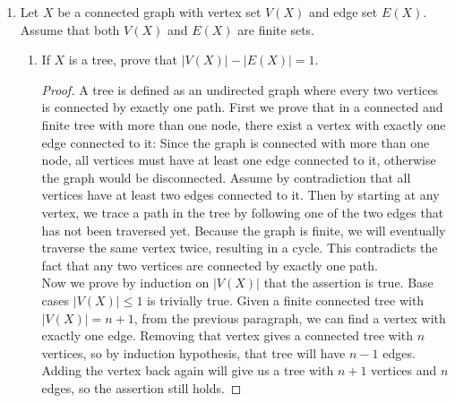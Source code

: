 \documentclass{article}
\begin{document}
\begin{enumerate}[label={\bf Q\arabic*:}]
\begin{proof}
      $\phi$ can be extended to a homomorphism since it defines a map for
      all generators. This homomorphism will be subjective because all
      generators $r$ and $s$ of the range $D_8$ has a pre-image.
      Furthermore, this homomorphism is well-defined because it preserves
      the relations on $\pi_1(\sum_g,p)$; we can verify that
      \begin{equation*}
        \phi(a_1b_1a_1^{-1}b_1^{-1}\ldots a_gb_ga_g^{-1}b_g^{-1}) =
        1_{D_8}.
      \end{equation*}
      Hence $\pi_1(\sum_g,p)$ is not abelian.
    \end{proof}

  \item Let $X$ be a connected graph with vertex set $V(X)$ and edge set
    $E(X)$. Assume that both $V(X)$ and $E(X)$ are finite sets.
    \begin{enumerate}
      \item If $X$ is a tree, prove that $|V(X)|-|E(X)|=1$.
        \begin{proof}
          A tree is defined as an undirected graph where every two vertices
          is connected by exactly one path. First we prove that in a
          connected and finite tree with more than one node, there exist a
          vertex with exactly one edge connected to it: Since the graph is
          connected with more than one node, all vertices must have at
          least one edge connected to it, otherwise the graph would be
          disconnected. Assume by contradiction that all vertices have at
          least two edges connected to it. Then by starting at any vertex,
          we trace a path in the tree by following one of the two edges
          that has not been traversed yet. Because the graph is finite, we
          will eventually traverse the same vertex twice, resulting in a
          cycle. This contradicts the fact that any two vertices are
          connected by exactly one path. \\

          Now we prove by induction on $|V(X)|$ that the assertion is true.
          Base cases $|V(X)|\leq 1$ is trivially true. Given a finite
          connected tree with $|V(X)|=n+1$, from the previous paragraph,
          we can find a vertex with exactly one edge. Removing that vertex
          gives a connected tree with $n$ vertices, so by induction
          hypothesis, that tree will have $n-1$ edges. Adding the
          vertex back again will give us a tree with $n+1$ vertices and
          $n$ edges, so the assertion still holds.
        \end{proof}


\end{enumerate}
\end{enumerate}
\end{document}
